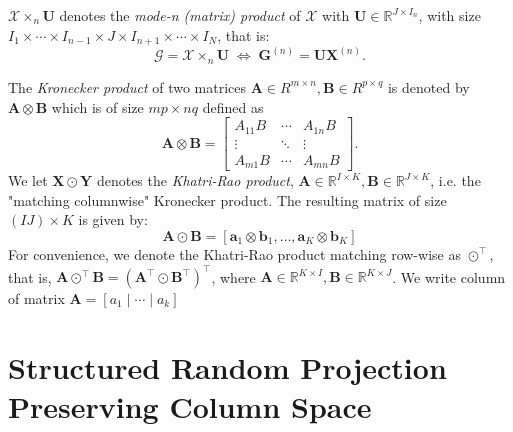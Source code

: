 \documentclass[letterpaper]{article}
\begin{document}
 $\mathscr{X} \times_n \mathbf{U}$ denotes the \textit{mode-n (matrix) product} of $\mathscr{X}$ with $\mathbf{U} \in \mathbb{R}^{J \times I_n}$, with size $I_1 \times \cdots \times I_{n-1} \times J \times I_{n+1} \times \cdots \times I_N$, that is:
\begin{equation}
\mathscr{G} = \mathscr{X} \times_n \mathbf{U} \; \iff \; \mathbf{G}^{(n)} = \mathbf{U}\mathbf{X}^{(n)}.
\end{equation}

The \textit{Kronecker product} of two matrices $\mathbf{A}\in R^{m\times n},\mathbf{B} \in R^{p\times q}$ is denoted by $\mathbf{A} \otimes \mathbf{B}$ which is of size $mp\times nq$ defined as 
\begin{equation}
\mathbf{A} \otimes \mathbf{B} = \left[
\begin{array}{ccc}
  A_{11}B   & \cdots & A_{1n}B \\
  \vdots & \ddots & \vdots \\
  A_{m1}B & \cdots &   A_{mn}B
\end{array}
\right].
\end{equation}
We let $\mathbf{X} \odot \mathbf{Y}$ denotes the \textit{Khatri-Rao product}, $\mathbf{A} \in \mathbb{R}^{I \times K}, \mathbf{B} \in \mathbb{R}^{J \times K}$, i.e. the "matching columnwise" Kronecker product. The resulting matrix of size $(IJ) \times K$ is given by: 
\begin{equation}\label{khatri-rao}
\mathbf{A} \odot \mathbf{B} = [\mathbf{a}_1 \otimes \mathbf{b}_1, \dots, \mathbf{a}_K \otimes \mathbf{b}_K]
\end{equation}
For convenience, we denote the Khatri-Rao product matching row-wise as $\odot^\top$, that is, $\mathbf{A} \odot^\top \mathbf{B} = (\mathbf{A}^\top \odot \mathbf{B}^\top)^\top $, where $\mathbf{A} \in \mathbb{R}^{K \times I}, \mathbf{B} \in \mathbb{R}^{K \times J}$. We write column of matrix $\mathbf{A} = [a_1\mid \cdots \mid a_k]$






\section{Structured Random Projection Preserving Column Space}
\end{document}
